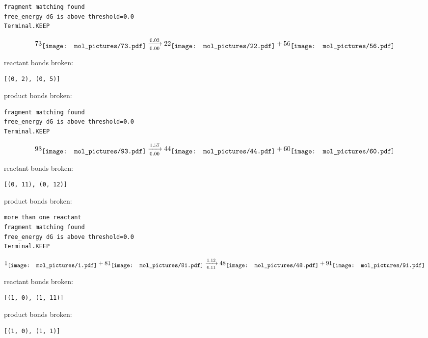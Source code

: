 \documentclass{article}
\begin{document}
\vspace{1cm}
\begin{verbatim}
fragment matching found
free_energy dG is above threshold=0.0
Terminal.KEEP
\end{verbatim}
$$
73
\raisebox{-.5\height}{\texttt{[image: mol\_pictures/73.pdf]}}
\xrightarrow[0.00]{0.03}
22
\raisebox{-.5\height}{\texttt{[image: mol\_pictures/22.pdf]}}
+
56
\raisebox{-.5\height}{\texttt{[image: mol\_pictures/56.pdf]}}
$$


reactant bonds broken:\begin{verbatim}
[(0, 2), (0, 5)]
\end{verbatim}
product bonds broken:



\vspace{1cm}
\begin{verbatim}
fragment matching found
free_energy dG is above threshold=0.0
Terminal.KEEP
\end{verbatim}
$$
93
\raisebox{-.5\height}{\texttt{[image: mol\_pictures/93.pdf]}}
\xrightarrow[0.00]{1.57}
44
\raisebox{-.5\height}{\texttt{[image: mol\_pictures/44.pdf]}}
+
60
\raisebox{-.5\height}{\texttt{[image: mol\_pictures/60.pdf]}}
$$


reactant bonds broken:\begin{verbatim}
[(0, 11), (0, 12)]
\end{verbatim}
product bonds broken:



\vspace{1cm}
\begin{verbatim}
more than one reactant
fragment matching found
free_energy dG is above threshold=0.0
Terminal.KEEP
\end{verbatim}
$$
1
\raisebox{-.5\height}{\texttt{[image: mol\_pictures/1.pdf]}}
+
81
\raisebox{-.5\height}{\texttt{[image: mol\_pictures/81.pdf]}}
\xrightarrow[0.11]{1.12}
48
\raisebox{-.5\height}{\texttt{[image: mol\_pictures/48.pdf]}}
+
91
\raisebox{-.5\height}{\texttt{[image: mol\_pictures/91.pdf]}}
$$


reactant bonds broken:\begin{verbatim}
[(1, 0), (1, 11)]
\end{verbatim}
product bonds broken:\begin{verbatim}
[(1, 0), (1, 1)]
\end{verbatim}
\end{document}
